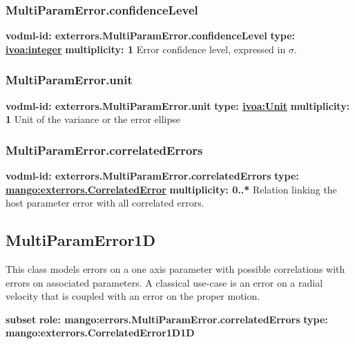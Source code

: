     \subsubsection{MultiParamError.confidenceLevel}
      \textbf{vodml-id: exterrors.MultiParamError.confidenceLevel} \newline
      \textbf{type: \hyperref[sect:ivoa]{ivoa:integer}} \newline
      \textbf{multiplicity: 1} \newline 
      Error confidence level, expressed in $\sigma$.

    \subsubsection{MultiParamError.unit}
      \textbf{vodml-id: exterrors.MultiParamError.unit} \newline
      \textbf{type: \hyperref[sect:ivoa]{ivoa:Unit}} \newline
      \textbf{multiplicity: 1} \newline 
      Unit of the variance or the error ellipse

    \subsubsection{MultiParamError.correlatedErrors}
      \textbf{vodml-id: exterrors.MultiParamError.correlatedErrors} \newline
      \textbf{type: \hyperref[sect:exterrors.CorrelatedError]{mango:exterrors.CorrelatedError}} \newline
      \textbf{multiplicity: 0..*} \newline 
      Relation linking the host parameter error with all correlated errors.

  \subsection{MultiParamError1D}
  \label{sect:exterrors.MultiParamError1D}
    This class models errors on a one axis parameter with possible correlations with errors on associated parameters. A classical use-case is an error on a radial velocity that is coupled with an error on the proper motion.

    \noindent \textbf{subset} \newline
    \indent   \textbf{role: mango:errors.MultiParamError.correlatedErrors} \newline
    \indent   \textbf{type:  mango:exterrors.CorrelatedError1D1D} \newline


